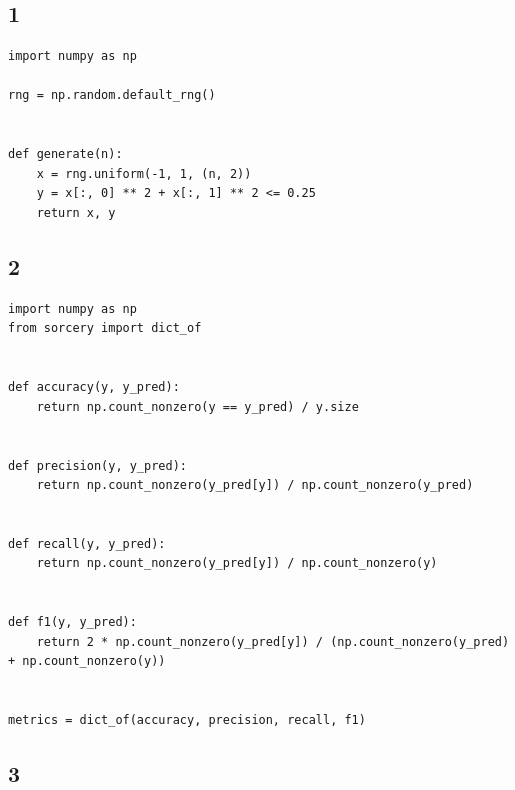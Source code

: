 \documentclass[11pt]{article}
\begin{document}
\subsection*{1}
\label{sec:org89cd141}

\begin{verbatim}
import numpy as np

rng = np.random.default_rng()


def generate(n):
    x = rng.uniform(-1, 1, (n, 2))
    y = x[:, 0] ** 2 + x[:, 1] ** 2 <= 0.25
    return x, y
\end{verbatim}

\subsection*{2}
\label{sec:orgfacef09}

\begin{verbatim}
import numpy as np
from sorcery import dict_of


def accuracy(y, y_pred):
    return np.count_nonzero(y == y_pred) / y.size


def precision(y, y_pred):
    return np.count_nonzero(y_pred[y]) / np.count_nonzero(y_pred)


def recall(y, y_pred):
    return np.count_nonzero(y_pred[y]) / np.count_nonzero(y)


def f1(y, y_pred):
    return 2 * np.count_nonzero(y_pred[y]) / (np.count_nonzero(y_pred) + np.count_nonzero(y))


metrics = dict_of(accuracy, precision, recall, f1)
\end{verbatim}

\subsection*{3}
\label{sec:org9ff7f1e}
\end{document}
